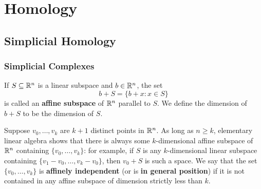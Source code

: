 \chapter{Homology}
\section{Simplicial Homology}
\subsection{Simplicial Complexes}
If $S\subseteq\mathbb{R}^n$ is a linear subspace and $b\in\mathbb{R}^n$, the set
\[b+S=\{b+x:x\in S\}\]
is called an \textbf{affine subspace} of $\mathbb{R}^n$ parallel to $S$. We define the dimension of $b+S$ to be the dimension of $S$.\par
Suppose $v_0,\dots,v_k$ are $k+1$ distinct points in $\mathbb{R}^n$. As long as $n\geq k$, elementary linear algebra shows that there is always some $k$-dimensional affine subspace of $\mathbb{R}^n$ containing $\{v_0,\dots,v_k\}$: for example, if $S$ is any $k$-dimensional linear subspace containing $\{v_1-v_0,\dots,v_k-v_0\}$, then $v_0+S$ is such a space. We say that the set $\{v_0,\dots,v_k\}$ is \textbf{affinely independent} (or is \textbf{in general position}) if it is not contained in any affine subspace of dimension strictly less than $k$.

